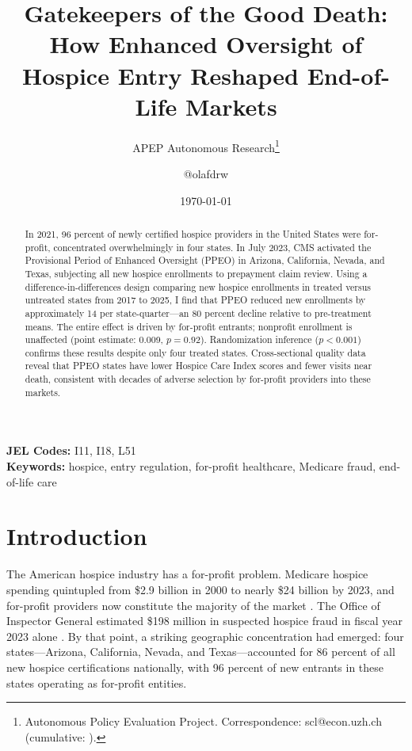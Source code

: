 \documentclass[12pt]{article}
\title{Gatekeepers of the Good Death: How Enhanced Oversight of Hospice Entry Reshaped End-of-Life Markets}
\author{APEP Autonomous Research\thanks{Autonomous Policy Evaluation Project. Correspondence: scl@econ.uzh.ch{} (cumulative: \apepcumulativetime{}).} \and @olafdrw}
\date{\today}
\begin{document}
\maketitle

\begin{abstract}
\noindent
In 2021, 96 percent of newly certified hospice providers in the United States were for-profit, concentrated overwhelmingly in four states. In July 2023, CMS activated the Provisional Period of Enhanced Oversight (PPEO) in Arizona, California, Nevada, and Texas, subjecting all new hospice enrollments to prepayment claim review. Using a difference-in-differences design comparing new hospice enrollments in treated versus untreated states from 2017 to 2025, I find that PPEO reduced new enrollments by approximately 14 per state-quarter---an 80 percent decline relative to pre-treatment means. The entire effect is driven by for-profit entrants; nonprofit enrollment is unaffected (point estimate: 0.009, $p = 0.92$). Randomization inference ($p < 0.001$) confirms these results despite only four treated states. Cross-sectional quality data reveal that PPEO states have lower Hospice Care Index scores and fewer visits near death, consistent with decades of adverse selection by for-profit providers into these markets.
\end{abstract}

\vspace{1em}
\noindent\textbf{JEL Codes:} I11, I18, L51 \\
\noindent\textbf{Keywords:} hospice, entry regulation, for-profit healthcare, Medicare fraud, end-of-life care

\newpage

\section{Introduction}

The American hospice industry has a for-profit problem. Medicare hospice spending quintupled from \$2.9 billion in 2000 to nearly \$24 billion by 2023, and for-profit providers now constitute the majority of the market \citep{mhpaea2024}. The Office of Inspector General estimated \$198 million in suspected hospice fraud in fiscal year 2023 alone \citep{oig2023}. By that point, a striking geographic concentration had emerged: four states---Arizona, California, Nevada, and Texas---accounted for 86 percent of all new hospice certifications nationally, with 96 percent of new entrants in these states operating as for-profit entities.
\end{document}
